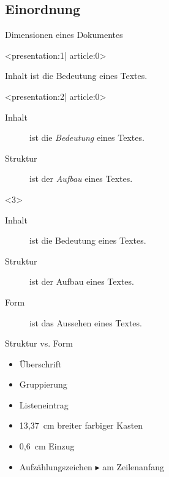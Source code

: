 
\subsection{Einordnung}

\begin{frame}{Dimensionen eines Dokumentes}
  \begin{onlyenv}<presentation:1| article:0>
    \begin{center}
      Inhalt ist die Bedeutung eines Textes.
    \end{center}
  \end{onlyenv}
  \begin{onlyenv}<presentation:2| article:0>
    \begin{description}
      \item[\textnormal{\color{black}Inhalt}] ist die \emph{Bedeutung} eines Textes.
      \item[\textnormal{\color{black}Struktur}] ist der \emph{Aufbau} eines Textes.
    \end{description}
  \end{onlyenv}
  \begin{onlyenv}<3>
    \begin{description}
      \item[Inhalt] ist die \alert{Bedeutung} eines Textes.
      \item[Struktur] ist der \alert{Aufbau} eines Textes.
      \item[Form] ist das \alert{Aussehen} eines Textes.
    \end{description}
  \end{onlyenv}
\end{frame}

\begin{frame}{Struktur vs. Form}
  \begin{Beispiele}[Struktur]
    \begin{itemize}
      \item Überschrift
      \item Gruppierung
      \item Listeneintrag
    \end{itemize}
  \end{Beispiele}

  \xxx

  \begin{Beispiele}[Form]
    \begin{itemize}
      \item 13{,}37~cm breiter farbiger Kasten
      \item 0{,}6~cm Einzug
      \item Aufzählungszeichen $\blacktriangleright$ am Zeilenanfang
    \end{itemize}
  \end{Beispiele}
\end{frame}

